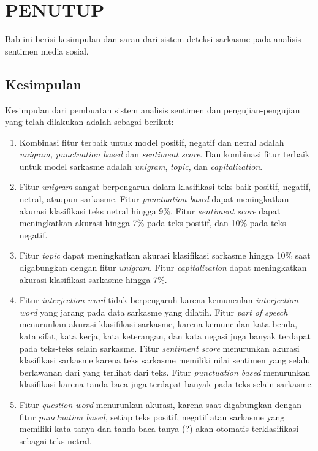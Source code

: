 \chapter{PENUTUP}

%
\vspace{4.5pt}
Bab ini berisi kesimpulan dan saran dari sistem deteksi sarkasme pada 
analisis sentimen media sosial. 
\section{Kesimpulan}
Kesimpulan dari pembuatan sistem analisis sentimen dan 
pengujian-pengujian yang telah dilakukan adalah sebagai berikut:
\begin{enumerate}
	\item Kombinasi fitur terbaik untuk model positif, negatif dan netral adalah \textit{unigram, punctuation based }dan \textit{sentiment score}. Dan kombinasi fitur terbaik untuk model sarkasme adalah \textit{unigram}, \textit{topic}, dan \textit{capitalization}. 
	\item Fitur \textit{unigram }sangat berpengaruh dalam klasifikasi teks baik positif, negatif, netral, ataupun sarkasme. Fitur \textit{punctuation based} dapat meningkatkan akurasi klasifikasi teks netral hingga 9\%. Fitur \textit{sentiment score} dapat meningkatkan akurasi hingga 7\% pada teks positif, dan 10\% pada teks negatif.
	\item Fitur \textit{topic }dapat meningkatkan akurasi klasifikasi sarkasme hingga 10\% saat digabungkan dengan fitur \textit{unigram}. Fitur \textit{capitalization }dapat meningkatkan akurasi klasifikasi sarkasme hingga 7\%.
	\item Fitur \textit{interjection word }tidak berpengaruh karena kemunculan \textit{interjection word }yang jarang pada data sarkasme yang dilatih. Fitur \textit{part of speech }menurunkan akurasi klasifikasi sarkasme, karena kemunculan kata benda, kata sifat, kata kerja, kata keterangan, dan kata negasi juga banyak terdapat pada teks-teks selain sarkasme. Fitur \textit{sentiment score }menurunkan 
	akurasi klasifikasi sarkasme karena teks sarkasme memiliki nilai sentimen yang selalu berlawanan dari yang terlihat dari teks. Fitur \textit{punctuation based} menurunkan klasifikasi karena tanda baca juga terdapat banyak pada teks selain sarkasme.
	\item Fitur \textit{question word }menurunkan akurasi, karena saat digabungkan dengan fitur \textit{punctuation based}, setiap teks positif, negatif atau sarkasme yang memiliki kata tanya dan tanda baca tanya (?) akan otomatis terklasifikasi sebagai teks netral.

\end{enumerate}
